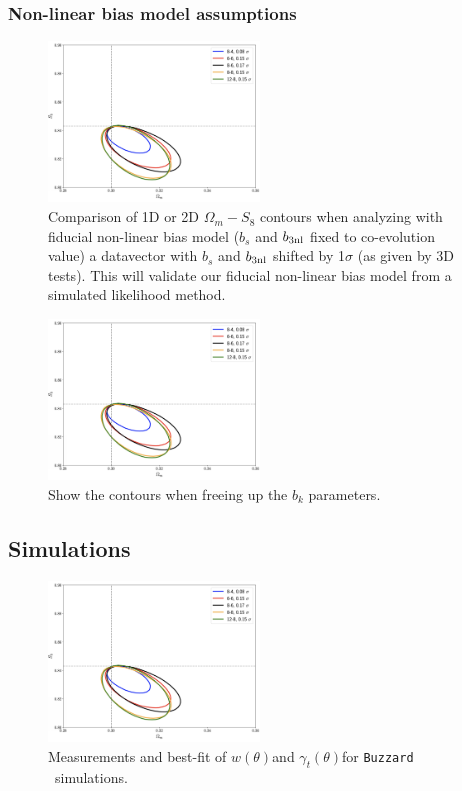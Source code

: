 \documentclass[fleqn,usenatbib]{mnras}
\newcommand{\gammat}{\ensuremath{\gamma_{t}(\theta)}}
\newcommand{\wtheta}{\ensuremath{w(\theta)}}
\newcommand{\buzzard}{\texttt{Buzzard} }
\begin{document}
\subsubsection{Non-linear bias model assumptions}
\begin{figure}
\includegraphics[width=0.5\textwidth,draft]{figs/temp.png}
\caption[]{Comparison of 1D or 2D $\Omega_m-S_8$ contours when analyzing with fiducial non-linear bias model ($b_s$ and $b_{\rm 3nl}$ fixed to co-evolution value) a datavector with $b_s$ and $b_{\rm 3nl}$ shifted by 1$\sigma$ (as given by 3D tests). This will validate our fiducial non-linear bias model from a simulated likelihood method. }
\label{fig:nlbias_bsb3nl}
\end{figure}

\begin{figure}
\includegraphics[width=0.5\textwidth,draft]{figs/temp.png}
\caption[]{Show the contours when freeing up the $b_k$ parameters.}
\label{fig:nlbias_bk}
\end{figure}



\subsection{Simulations}

\begin{figure}
\includegraphics[width=0.5\textwidth,draft]{figs/temp.png}
\caption[]{Measurements and best-fit of \wtheta and \gammat for \buzzard \ simulations. 
}
\label{fig:buzzard_2pt}
\end{figure}
\end{document}
